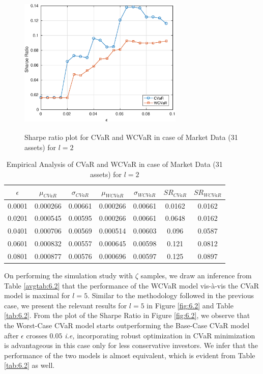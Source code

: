 \begin{figure}[!h]
    \centering
   
    \includegraphics[height=7.0cm,width=0.7\textwidth]{CVaR/bse30_market/sr_cvar_2.eps}

   \caption{Sharpe ratio plot for CVaR and WCVaR in case of Market Data (31 assets) for $l=2$}
   \label{fig:6.1}
\end{figure}

\begin{table}[!h]
    \centering
    \captionsetup{justification=centering}

   \begin{tabular}{||c|c|c|c|c|c|c||}
   \hline
  
$\epsilon$ & $\mu_{CVaR}$ & $\sigma_{CVaR}$ & $\mu_{WCVaR}$ & $\sigma_{WCVaR}$ & $SR_{CVaR}$ & $SR_{WCVaR}$\\
  
  \hline
0.0001 & 0.000266 & 0.00661 & 0.000266 & 0.00661 & 0.0162 & 0.0162 \\
0.0201 & 0.000545 & 0.00595 & 0.000266 & 0.00661 & 0.0648 & 0.0162 \\
0.0401 & 0.000706 & 0.00569 & 0.000514 & 0.00603 & 0.096 & 0.0587 \\
0.0601 & 0.000832 & 0.00557 & 0.000645 & 0.00598 & 0.121 & 0.0812 \\
0.0801 & 0.000877 & 0.00576 & 0.000696 & 0.00597 & 0.125 & 0.0897 \\
  \hline
\end{tabular}
    \caption{Empirical Analysis of CVaR and WCVaR in case of Market Data (31 assets) for $l=2$}
    \label{tab:6.1}
\end{table}

On performing the simulation study with $\zeta$ samples, we draw an inference from Table \ref{avgtab:6.2} that the performance of the WCVaR model vis-\`a-vis the CVaR model is maximal for $l=5$. Similar to the methodology followed in the previous case, we present the relevant results for $l=5$ in Figure \ref{fig:6.2} and Table \ref{tab:6.2}. From the plot of the Sharpe Ratio in Figure \ref{fig:6.2}, we observe that the Worst-Case CVaR model starts outperforming the Base-Case CVaR model after $\epsilon$ crosses $0.05$ \textit{i.e,} incorporating robust optimization in CVaR minimization is advantageous in this case only for less conservative investors. We infer that the performance of the two models is almost equivalent, which is evident from Table \ref{tab:6.2} as well.

